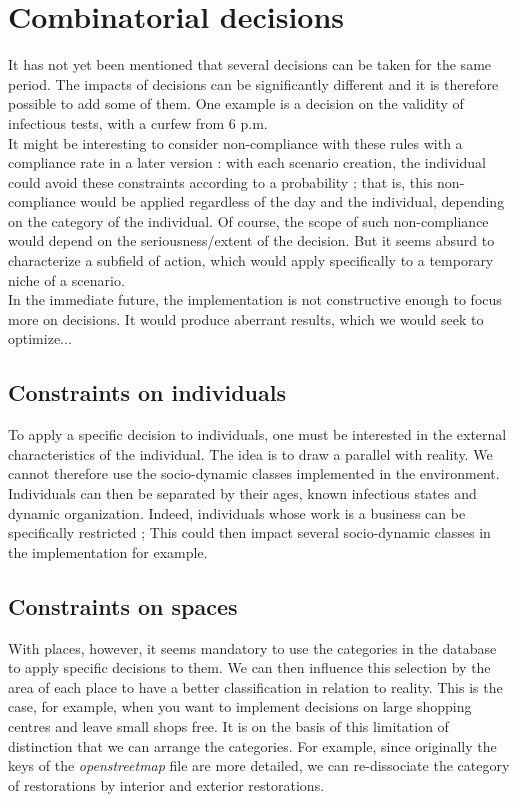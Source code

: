 \chapter{Combinatorial decisions}

It has not yet been mentioned that several decisions can be taken for the same period. The impacts of decisions can be significantly different and it is therefore possible to add some of them. One example is a decision on the validity of infectious tests, with a curfew from 6 p.m.\\

It might be interesting to consider non-compliance with these rules with a compliance rate in a later version : with each scenario creation, the individual could avoid these constraints according to a probability ; that is, this non- compliance would be applied regardless of the day and the individual, depending on the category of the individual. Of course, the scope of such non-compliance would depend on the seriousness/extent of the decision. But it seems absurd to characterize a subfield of action, which would apply specifically to a temporary niche of a scenario.\\

In the immediate future, the implementation is not constructive enough to focus more on decisions. It would produce aberrant results, which we would seek to optimize...\\

\section{Constraints on individuals}

To apply a specific decision to individuals, one must be interested in the external characteristics of the individual. The idea is to draw a parallel with reality. We cannot therefore use the socio-dynamic classes implemented in the environment. Individuals can then be separated by their ages, known infectious states and dynamic organization. Indeed, individuals whose work is a business can be specifically restricted ; This could then impact several socio-dynamic classes in the implementation for example.\\

\section{Constraints on spaces}

With places, however, it seems mandatory to use the categories in the database to apply specific decisions to them. We can then influence this selection by the area of each place to have a better classification in relation to reality. This is the case, for example, when you want to implement decisions on large shopping centres and leave small shops free. It is on the basis of this limitation of distinction that we can arrange the categories. For example, since originally the keys of the \textit{openstreetmap} file are more detailed, we can re-dissociate the category of restorations by interior and exterior restorations.\\

